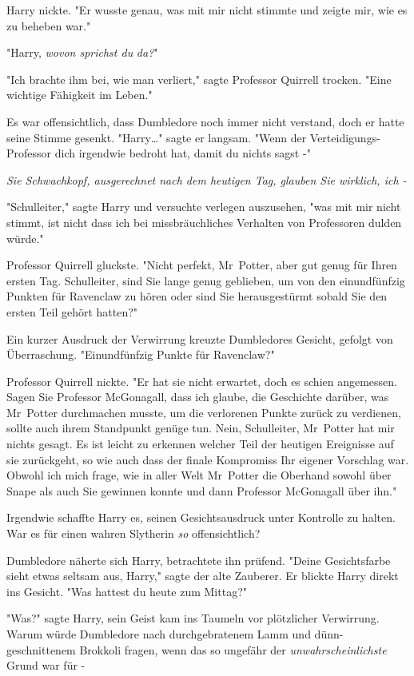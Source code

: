 {Harry nickte. "Er wusste genau, was mit mir nicht stimmte und zeigte mir, wie es zu beheben war."

"Harry, \emph{wovon sprichst du} \emph{da?}"

"Ich brachte ihm bei, wie man verliert," sagte Professor Quirrell trocken. "Eine wichtige Fähigkeit im Leben."

Es war offensichtlich, dass Dumbledore noch immer nicht verstand, doch er hatte seine Stimme gesenkt. "Harry…" sagte er langsam. "Wenn der Verteidigungs-Professor dich irgendwie bedroht hat, damit du nichts sagst -"

\emph{Sie Schwachkopf, ausgerechnet nach dem heutigen Tag, glauben Sie wirklich, ich -}

"Schulleiter," sagte Harry und versuchte verlegen auszusehen, "was mit mir nicht stimmt, ist nicht dass ich bei missbräuchliches Verhalten von Professoren dulden würde."

Professor Quirrell gluckste. "Nicht perfekt, Mr~Potter, aber gut genug für Ihren ersten Tag. Schulleiter, sind Sie lange genug geblieben, um von den einundfünfzig Punkten für Ravenclaw zu hören oder sind Sie herausgestürmt sobald Sie den ersten Teil gehört hatten?"

Ein kurzer Ausdruck der Verwirrung kreuzte Dumbledores Gesicht, gefolgt von Überraschung. "Einundfünfzig Punkte für Ravenclaw?"

Professor Quirrell nickte. "Er hat sie nicht erwartet, doch es schien angemessen. Sagen Sie Professor McGonagall, dass ich glaube, die Geschichte darüber, was Mr~Potter durchmachen musste, um die verlorenen Punkte zurück zu verdienen, sollte auch ihrem Standpunkt genüge tun. Nein, Schulleiter, Mr~Potter hat mir nichts gesagt. Es ist leicht zu erkennen welcher Teil der heutigen Ereignisse auf sie zurückgeht, so wie auch dass der finale Kompromiss Ihr eigener Vorschlag war. Obwohl ich mich frage, wie in aller Welt Mr~Potter die Oberhand sowohl über Snape als auch Sie gewinnen konnte und dann Professor McGonagall über ihn."

Irgendwie schaffte Harry es, seinen Gesichtsausdruck unter Kontrolle zu halten. War es für einen wahren Slytherin \emph{so} offensichtlich?

Dumbledore näherte sich Harry, betrachtete ihn prüfend. "Deine Gesichtsfarbe sieht etwas seltsam aus, Harry," sagte der alte Zauberer. Er blickte Harry direkt ins Gesicht. "Was hattest du heute zum Mittag?"

"Was?" sagte Harry, sein Geist kam ins Taumeln vor plötzlicher Verwirrung. Warum würde Dumbledore nach durchgebratenem Lamm und dünn-geschnittenem Brokkoli fragen, wenn das so ungefähr der \emph{unwahrscheinlichste} Grund war für -

}
